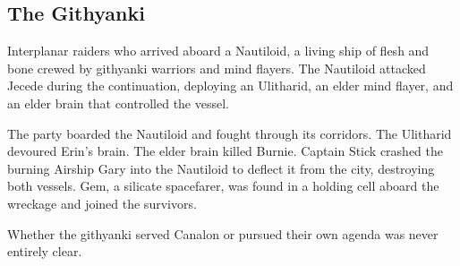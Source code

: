 \smallskip

\subsection*{The Githyanki}

Interplanar raiders who arrived aboard a Nautiloid, a living ship of flesh and bone crewed by githyanki warriors and mind flayers.  The Nautiloid attacked Jecede during the continuation, deploying an Ulitharid, an elder mind flayer, and an elder brain that controlled the vessel.

The party boarded the Nautiloid and fought through its corridors.  The Ulitharid devoured Erin's brain.  The elder brain killed Burnie.  Captain Stick crashed the burning Airship Gary into the Nautiloid to deflect it from the city, destroying both vessels.  Gem, a silicate spacefarer, was found in a holding cell aboard the wreckage and joined the survivors.

Whether the githyanki served Canalon or pursued their own agenda was never entirely clear.

\smallskip

\bigskip

\clearpage
